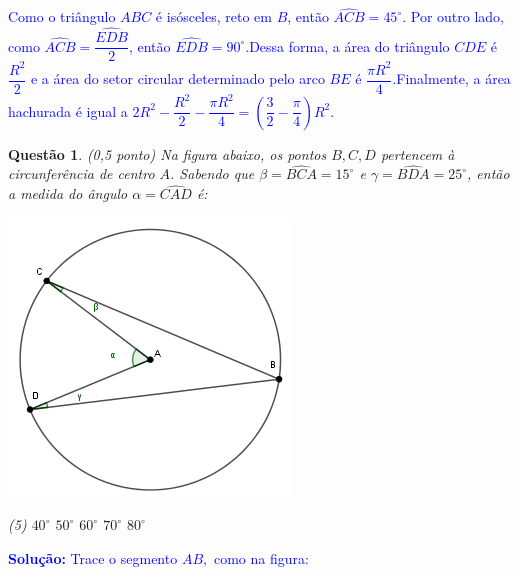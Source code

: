 \documentclass[oneside,a4paper,12pt]{article}
\newcommand{\negrito}[1]{\mbox{\boldmath{$#1$}}}
\theoremstyle{Colorido}
\theoremstyle{solu}
\theoremstyle{dotlessP}
\newcommand{\solucao}[1]{\textcolor{blue}{\textbf{Solução:} #1}}
\newtheorem{sol}{Questão}
\begin{document}
\textcolor{blue}{Como o triângulo $ABC$ é isósceles, reto em $B$, então $\widehat{ACB}=45^\circ$. Por outro lado, como $\widehat{ACB}=\dfrac{\widehat{EDB}}{2}$, então $\widehat{EDB} = 90^\circ$.\newline\newline Dessa forma, a área do triângulo $CDE$ é $\dfrac{R^2}{2}$ e a área do setor circular determinado pelo arco $BE$ é $\dfrac{\pi R^2}{4}$.\newline\newline Finalmente, a área hachurada é igual a $2R^2 - \dfrac{R^2}{2} - \dfrac{\pi R^2}{4} = \left(\dfrac{3}{2} - \dfrac{\pi}{4} \right) R^2$.}
\newpage
	\begin{sol}
\textit{(0,5 ponto)} \newline \newline Na figura abaixo, os pontos $B, C, D$ pertencem à circunferência de centro $A$. Sabendo que $\beta=\widehat{BCA}=15^\circ$ e $\gamma = \widehat{BDA}=25^\circ$, então a medida do ângulo $\alpha=\widehat{CAD}$ é:
\begin{center}
\includegraphics[scale=2.5]{Provas e Avaliações/Figuras avaliações/5avaliacaociclo3.png}
\end{center}

\begin{tasks}[counter-format={(tsk[a])},label-width=3.6ex, label-format = {\bfseries}, column-sep = {20pt}](5)
\task[\textcolor{blue}{$\negrito{(a)} $}] $40^\circ$
\task[\textcolor{blue}{$\negrito{(b)} $}] $50^\circ$
\task[\textcolor{blue}{$\negrito{(c)} $}] $60^\circ$
\task[\textcolor{blue}{$\negrito{(d)} $}] $70^\circ$
\task[\textcolor{blue}{$\negrito{(e)} $}] $80^\circ$
\end{tasks}
\end{sol}
\solucao{Trace o segmento $AB,$ como na figura:}
\end{document}
